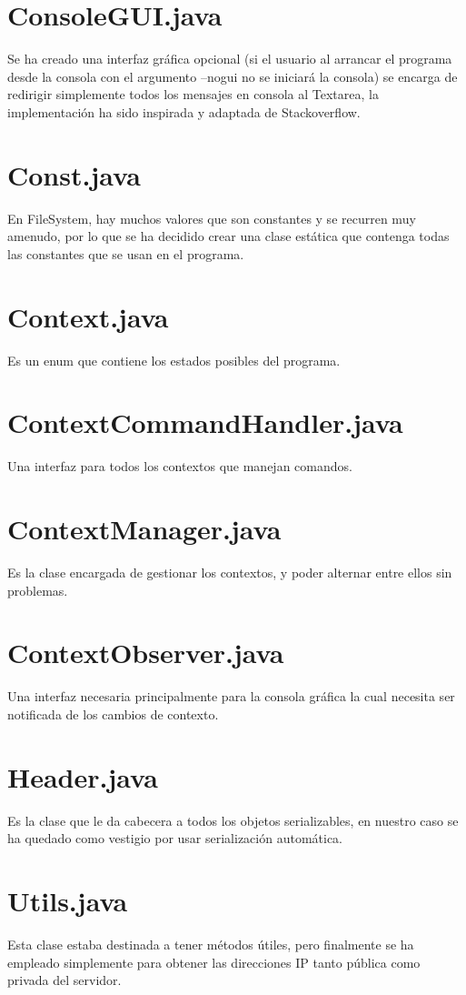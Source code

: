 \documentclass[a4paper, 12pt]{report}
\begin{document}
\section{ConsoleGUI.java}
Se ha creado una interfaz gráfica opcional (si el usuario al arrancar el programa desde la consola con el argumento --nogui no se iniciará la consola) se encarga de redirigir simplemente todos los mensajes en consola al Textarea, la implementación ha sido inspirada y adaptada de Stackoverflow. \cite{console-output-to-textarea}
\section{Const.java}
En FileSystem, hay muchos valores que son constantes y se recurren muy amenudo, por lo que se ha decidido crear una clase estática que contenga todas las constantes que se usan en el programa.
\section{Context.java}
Es un enum que contiene los estados posibles del programa.
\section{ContextCommandHandler.java}
Una interfaz para todos los contextos que manejan comandos.
\section{ContextManager.java}
Es la clase encargada de gestionar los contextos, y poder alternar entre ellos sin problemas.
\section{ContextObserver.java}
Una interfaz necesaria principalmente para la consola gráfica la cual necesita ser notificada de los cambios de contexto.
\section{Header.java}
Es la clase que le da cabecera a todos los objetos serializables, en nuestro caso se ha quedado como vestigio por usar serialización automática.
\section{Utils.java}
Esta clase estaba destinada a tener métodos útiles, pero finalmente se ha empleado simplemente para obtener las direcciones IP tanto pública como privada del servidor.	
\end{document}
